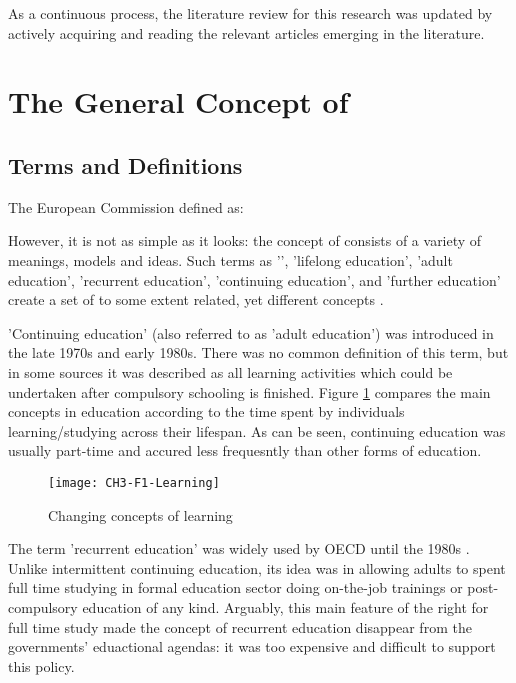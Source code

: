 As a continuous process, the literature review for this research was updated by
actively acquiring and reading the relevant articles emerging in the literature.

\section{The General Concept of \LLLc}
\label{sec:concepts}
\subsection{Terms and Definitions}

The European Commission \citeyearpar{EuropeanCommission2000} defined \LLLs as:


However, it is not as simple as it looks: the concept of \LLLs consists of a
variety of meanings, models and ideas. Such terms as '\LLLsn', 'lifelong
education', 'adult education', 'recurrent education', 'continuing education',
and 'further education' create a set of to some extent related, yet different
concepts \citep{Hager2011}.

'Continuing education' (also referred to as 'adult education') was introduced in
the late 1970s and early 1980s. There was no common definition of this term,
but in some sources  \citep{Jarvis2004} it was described as all learning
activities which could be undertaken after compulsory schooling is finished.
Figure \ref{fig:learning} compares the main concepts in education according to
the time spent by individuals learning/studying across their lifespan. As can be
seen, continuing education was usually part-time and accured less frequesntly
than other forms of education.

\begin{figure}[htb]
\centering
\texttt{[image: CH3-F1-Learning]}
\caption[Changing concepts of learning]{Changing concepts of learning 
\citep{Jarvis2004}}
\label{fig:learning}
\end{figure}

The term 'recurrent education' was widely used by OECD until the 1980s
\citep{Jarvis2004}. Unlike intermittent continuing education, its idea was
in allowing adults to spent full time studying in formal education sector doing
on-the-job trainings or post-compulsory education of any kind. Arguably, this
main feature of the right for full time study made the concept of recurrent
education disappear from the governments' eduactional agendas: it was too
expensive and difficult to support this policy.

